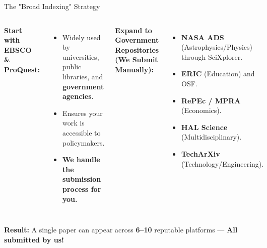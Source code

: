 \documentclass[10pt, aspectratio=169]{beamer}
\begin{document}
	\begin{frame}{The "Broad Indexing" Strategy}
		\begin{columns}[T]
			\textbf{Start with EBSCO \& ProQuest:}
			\begin{itemize}
				\item Widely used by universities, public libraries, and \textbf{government agencies}.
				\item Ensures your work is accessible to policymakers.
				\item \textcolor{myblue}{\textbf{We handle the submission process for you.}}
			\end{itemize}
			
			\vspace{0.3cm}
			\textbf{Expand to Government Repositories (We Submit Manually):}
			\begin{itemize}
				\item \textbf{NASA ADS} (Astrophysics/Physics) through SciXplorer.
				\item \textbf{ERIC} (Education) and OSF.
				\item \textbf{RePEc / MPRA} (Economics).
				\item \textbf{HAL Science} (Multidisciplinary).
				\item \textbf{TechArXiv} (Technology/Engineering).
			\end{itemize}
		\end{columns}
		\vspace{0.3cm}
		\begin{center}
			\textbf{Result:} A single paper can appear across \textcolor{myblue}{\textbf{6–10}} reputable platforms — \textcolor{mygreen}{\textbf{All submitted by us!}}
		\end{center}
	\end{frame}
	
\end{document}
